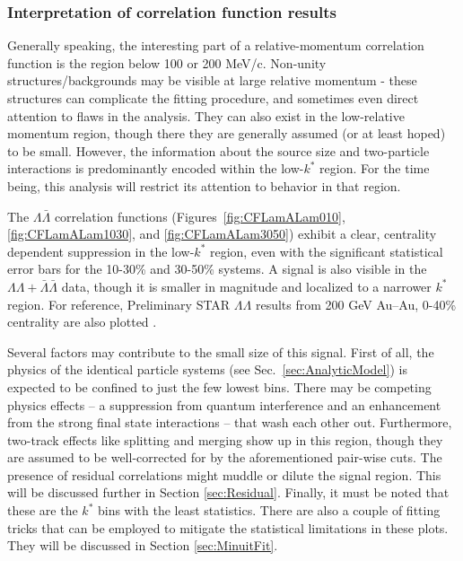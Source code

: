 \subsubsection{Interpretation of correlation function results}
\label{sec:CFInterpretation}


Generally speaking, the interesting part of a relative-momentum correlation function is the region below 100 or 200 MeV/c.  
Non-unity structures/backgrounds may be visible at large relative momentum - these structures can complicate the fitting procedure, and sometimes even direct attention to flaws in the analysis.  
They can also exist in the low-relative momentum region, though there they are generally assumed (or at least hoped) to be small.  
However, the information about the source size and two-particle interactions is predominantly encoded within the low-$k^*$ region.  
For the time being, this analysis will restrict its attention to behavior in that region.

The $\Lambda\bar{\Lambda}$ correlation functions (Figures\ \ref{fig:CFLamALam010}, \ref{fig:CFLamALam1030}, and \ref{fig:CFLamALam3050}) exhibit a clear, centrality dependent suppression in the low-$k^*$ region, even with the significant statistical error bars for the 10-30\% and 30-50\% systems.  
A signal is also visible in the $\Lambda\Lambda + \bar{\Lambda}\bar{\Lambda}$ data, though it is smaller in magnitude and localized to a narrower $k^*$ region. 
For reference, Preliminary STAR $\Lambda\Lambda$ results from 200 GeV Au--Au, 0-40\% centrality are also plotted \cite{Shah:2012ps}.

Several factors may contribute to the small size of this signal.  
First of all, the physics of the identical particle systems (see Sec.\ \ref{sec:AnalyticModel}) is expected to be confined to just the few lowest bins.  
There may be competing physics effects -- a suppression from quantum interference and an enhancement from the strong final state interactions -- that wash each other out.  
Furthermore, two-track effects like splitting and merging show up in this region, though they are assumed to be well-corrected for by the aforementioned pair-wise cuts.  
The presence of residual correlations might muddle or dilute the signal region.  
This will be discussed further in Section \ref{sec:Residual}.  
Finally, it must be noted that these are the $k^*$ bins with the least statistics.  
There are also a couple of fitting tricks that can be employed to mitigate the statistical limitations in these plots.  
They will be discussed in Section \ref{sec:MinuitFit}.

